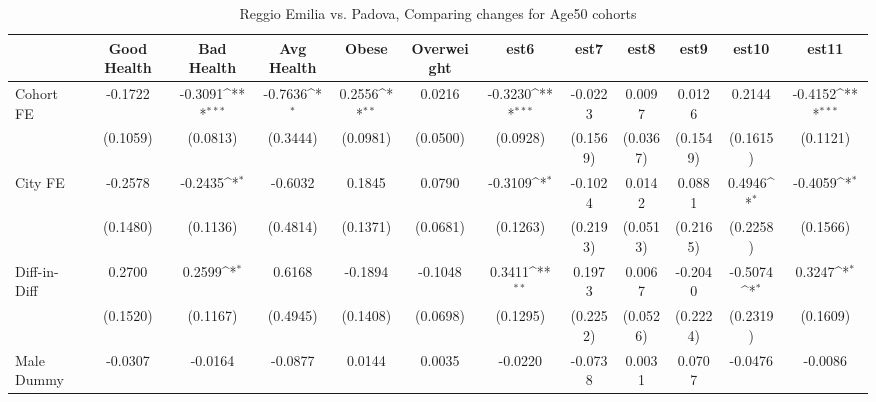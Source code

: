 \begin{table}[htbp]\centering
\def\sym#1{\ifmmode^{#1}\else\(^{#1}\)\fi}
\caption{Reggio Emilia vs. Padova, Comparing changes for Age50 cohorts}
\begin{tabular}{l*{11}{c}}
\toprule
            &\multicolumn{1}{c}{Good Health}&\multicolumn{1}{c}{Bad Health}&\multicolumn{1}{c}{Avg Health}&\multicolumn{1}{c}{Obese}&\multicolumn{1}{c}{Overweight}&\multicolumn{1}{c}{est6}&\multicolumn{1}{c}{est7}&\multicolumn{1}{c}{est8}&\multicolumn{1}{c}{est9}&\multicolumn{1}{c}{est10}&\multicolumn{1}{c}{est11}\\
\midrule
Cohort FE   &     -0.1722         &     -0.3091\sym{***}&     -0.7636\sym{*}  &      0.2556\sym{**} &      0.0216         &     -0.3230\sym{***}&     -0.0223         &      0.0097         &      0.0126         &      0.2144         &     -0.4152\sym{***}\\
            &    (0.1059)         &    (0.0813)         &    (0.3444)         &    (0.0981)         &    (0.0500)         &    (0.0928)         &    (0.1569)         &    (0.0367)         &    (0.1549)         &    (0.1615)         &    (0.1121)         \\
\addlinespace
City FE     &     -0.2578         &     -0.2435\sym{*}  &     -0.6032         &      0.1845         &      0.0790         &     -0.3109\sym{*}  &     -0.1024         &      0.0142         &      0.0881         &      0.4946\sym{*}  &     -0.4059\sym{*}  \\
            &    (0.1480)         &    (0.1136)         &    (0.4814)         &    (0.1371)         &    (0.0681)         &    (0.1263)         &    (0.2193)         &    (0.0513)         &    (0.2165)         &    (0.2258)         &    (0.1566)         \\
\addlinespace
Diff-in-Diff&      0.2700         &      0.2599\sym{*}  &      0.6168         &     -0.1894         &     -0.1048         &      0.3411\sym{**} &      0.1973         &      0.0067         &     -0.2040         &     -0.5074\sym{*}  &      0.3247\sym{*}  \\
            &    (0.1520)         &    (0.1167)         &    (0.4945)         &    (0.1408)         &    (0.0698)         &    (0.1295)         &    (0.2252)         &    (0.0526)         &    (0.2224)         &    (0.2319)         &    (0.1609)         \\
\addlinespace
Male Dummy  &     -0.0307         &     -0.0164         &     -0.0877         &      0.0144         &      0.0035         &     -0.0220         &     -0.0738         &      0.0031         &      0.0707         &     -0.0476         &     -0.0086         \\

\end{tabular}
\end{table}

